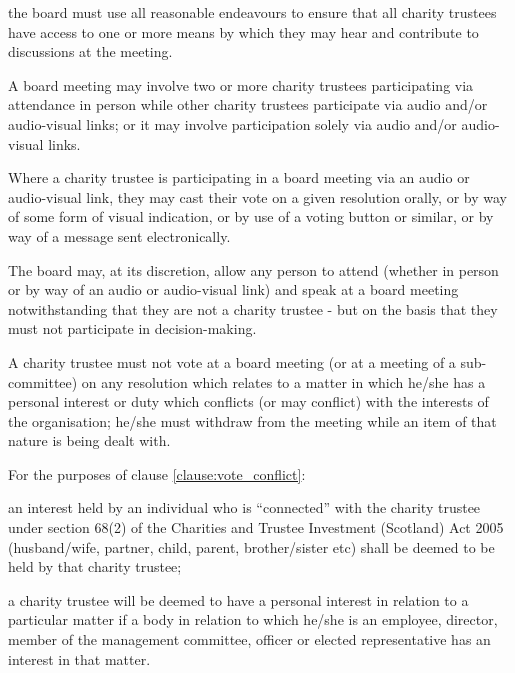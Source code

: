 ﻿\documentclass[a4paper,11pt,onecolumn ]{article}
\begin{document}
\begin{legal}
\begin{legal}[label=\alph*)]
    \item the board must use all reasonable endeavours to ensure that all charity trustees have access to one or more means by which they may hear and contribute to discussions at the meeting.
    \end{legal}
\item A board meeting may involve two or more charity trustees participating via attendance in person while other charity trustees participate via audio and/or audio-visual links; or it may involve participation solely via audio and/or audio-visual links.
\item Where a charity trustee is participating in a board meeting via an audio or audio-visual link, they may cast their vote on a given resolution orally, or by way of some form of visual indication, or by use of a voting button or similar, or by way of a message sent electronically. 
\item The board may, at its discretion, allow any person to attend (whether in person or by way of an audio or audio-visual link) and speak at a board meeting notwithstanding that they are not a charity trustee - but on the basis that they must not participate in decision-making.
\item \label{clause:vote_conflict} A charity trustee must not vote at a board meeting (or at a meeting of a sub-committee) on any resolution which relates to a matter in which he/she has a personal interest or duty which conflicts (or may conflict) with the interests of the organisation; he/she must withdraw from the meeting while an item of that nature is being dealt with.

\item For the purposes of clause \ref{clause:vote_conflict}:
    \begin{legal}
        \item an interest held by an individual who is “connected” with the charity trustee under section 68(2) of the Charities and Trustee Investment (Scotland) Act 2005 (husband/wife, partner, child, parent, brother/sister etc) shall be deemed to be held by that charity trustee;
        \item a charity trustee will be deemed to have a personal interest in relation to a particular matter if a body in relation to which he/she is an employee, director, member of the management committee, officer or elected representative has an interest in that matter.
    \end{legal}
\end{legal}
\end{document}
